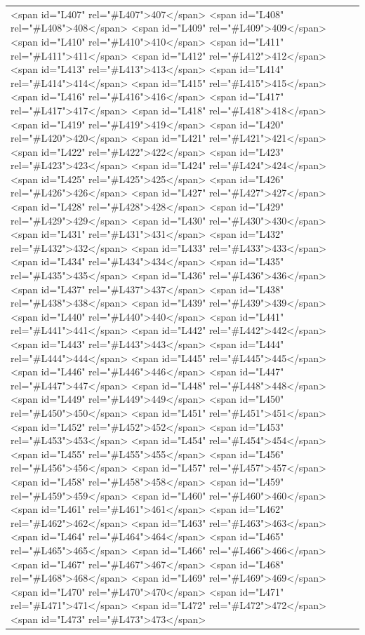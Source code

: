 \documentclass[a4paper,11pt,french]{article}
\begin{document}
\begin{tabular}{|m{8cm}|m{8cm}|}
<span id="L407" rel="#L407">407</span>
<span id="L408" rel="#L408">408</span>
<span id="L409" rel="#L409">409</span>
<span id="L410" rel="#L410">410</span>
<span id="L411" rel="#L411">411</span>
<span id="L412" rel="#L412">412</span>
<span id="L413" rel="#L413">413</span>
<span id="L414" rel="#L414">414</span>
<span id="L415" rel="#L415">415</span>
<span id="L416" rel="#L416">416</span>
<span id="L417" rel="#L417">417</span>
<span id="L418" rel="#L418">418</span>
<span id="L419" rel="#L419">419</span>
<span id="L420" rel="#L420">420</span>
<span id="L421" rel="#L421">421</span>
<span id="L422" rel="#L422">422</span>
<span id="L423" rel="#L423">423</span>
<span id="L424" rel="#L424">424</span>
<span id="L425" rel="#L425">425</span>
<span id="L426" rel="#L426">426</span>
<span id="L427" rel="#L427">427</span>
<span id="L428" rel="#L428">428</span>
<span id="L429" rel="#L429">429</span>
<span id="L430" rel="#L430">430</span>
<span id="L431" rel="#L431">431</span>
<span id="L432" rel="#L432">432</span>
<span id="L433" rel="#L433">433</span>
<span id="L434" rel="#L434">434</span>
<span id="L435" rel="#L435">435</span>
<span id="L436" rel="#L436">436</span>
<span id="L437" rel="#L437">437</span>
<span id="L438" rel="#L438">438</span>
<span id="L439" rel="#L439">439</span>
<span id="L440" rel="#L440">440</span>
<span id="L441" rel="#L441">441</span>
<span id="L442" rel="#L442">442</span>
<span id="L443" rel="#L443">443</span>
<span id="L444" rel="#L444">444</span>
<span id="L445" rel="#L445">445</span>
<span id="L446" rel="#L446">446</span>
<span id="L447" rel="#L447">447</span>
<span id="L448" rel="#L448">448</span>
<span id="L449" rel="#L449">449</span>
<span id="L450" rel="#L450">450</span>
<span id="L451" rel="#L451">451</span>
<span id="L452" rel="#L452">452</span>
<span id="L453" rel="#L453">453</span>
<span id="L454" rel="#L454">454</span>
<span id="L455" rel="#L455">455</span>
<span id="L456" rel="#L456">456</span>
<span id="L457" rel="#L457">457</span>
<span id="L458" rel="#L458">458</span>
<span id="L459" rel="#L459">459</span>
<span id="L460" rel="#L460">460</span>
<span id="L461" rel="#L461">461</span>
<span id="L462" rel="#L462">462</span>
<span id="L463" rel="#L463">463</span>
<span id="L464" rel="#L464">464</span>
<span id="L465" rel="#L465">465</span>
<span id="L466" rel="#L466">466</span>
<span id="L467" rel="#L467">467</span>
<span id="L468" rel="#L468">468</span>
<span id="L469" rel="#L469">469</span>
<span id="L470" rel="#L470">470</span>
<span id="L471" rel="#L471">471</span>
<span id="L472" rel="#L472">472</span>
<span id="L473" rel="#L473">473</span>

\end{tabular}
\end{document}
